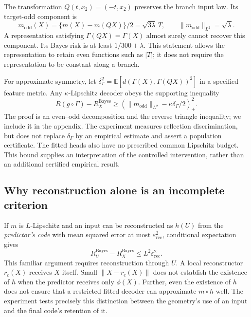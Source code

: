 \documentclass[10pt]{article}
\newcommand{\E}{\mathbb{E}}
\begin{document}
The transformation $Q(t,x_2)=(-t,x_2)$ preserves the branch input law.
Its target-odd component is
\begin{equation}
 m_{\mathrm{odd}}(X)=\{m(X)-m(QX)\}/2=\sqrt{3\lambda}\,T,
 \qquad \|m_{\mathrm{odd}}\|_{L^2}=\sqrt{\lambda}.
\end{equation}
A representation satisfying $\Gamma(QX)=\Gamma(X)$ almost surely cannot
recover this component. Its Bayes risk is at least $1/300+\lambda$.
This statement allows the representation to retain even functions such as
$|T|$; it does not require the representation to be constant along a branch.

For approximate symmetry, let
$\delta_\Gamma^2=\E[d(\Gamma(X),\Gamma(QX))^2]$ in a specified feature
metric. Any $\kappa$-Lipschitz decoder obeys the supporting inequality
\begin{equation}\label{eq:symmetrybound}
 R(g\circ\Gamma)-R_X^{\mathrm{Bayes}}
 \geq\left(\|m_{\mathrm{odd}}\|_{L^2}
                         -\kappa\delta_\Gamma/2\right)_+^2.
\end{equation}
The proof is an even--odd decomposition and the reverse triangle inequality;
we include it in the appendix. The experiment measures reflection
discrimination, but does not replace $\delta_\Gamma$ by an empirical estimate
and assert a population certificate. The fitted heads also have no prescribed
common Lipschitz budget. This bound supplies an interpretation of the
controlled intervention, rather than an additional certified empirical
result.

\subsection{Why reconstruction alone is an incomplete criterion}

If $m$ is $L$-Lipschitz and an input can be reconstructed as $h(U)$ from the
\emph{predictor's code} with mean squared error at most
$\varepsilon_{\mathrm{rec}}^2$, conditional expectation gives
\begin{equation}\label{eq:bridge}
 R_U^{\mathrm{Bayes}}-R_X^{\mathrm{Bayes}}
 \leq L^2\varepsilon_{\mathrm{rec}}^2.
\end{equation}
This familiar argument requires reconstruction through $U$. A local
reconstructor $r_c(X)$ receives $X$ itself. Small
$\|X-r_c(X)\|$ does not establish the existence of $h$ when the predictor
receives only $\phi(X)$. Further, even the existence of $h$ does not ensure
that a restricted fitted decoder can approximate $m\circ h$ well. The
experiment tests precisely this distinction between the geometry's use of
an input and the final code's retention of it.
\end{document}
